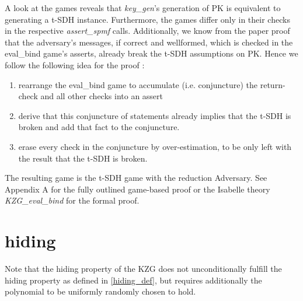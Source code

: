 A look at the games reveals that \textit{key\_gen}'s generation of PK is equivalent to generating a t-SDH instance. Furthermore, the games differ only in their checks in the respective \textit{assert\_spmf} calls.  
Additionally, we know from the paper proof that the adversary's messages, if correct and wellformed, which is checked in the eval\_bind game's asserts, already break the t-SDH assumptions on PK. 
Hence we follow the following idea for the proof :
\begin{enumerate}
    \item rearrange the eval\_bind game to accumulate (i.e. conjuncture) the return-check and all other checks into an assert
    \item derive that this conjuncture of statements already implies that the t-SDH is broken and add that fact to the conjuncture.
    \item erase every check in the conjuncture by over-estimation, to be only left with the result that the t-SDH is broken.
\end{enumerate}
The resulting game is the t-SDH game with the reduction Adversary. 
See Appendix A for the fully outlined game-based proof or the Isabelle theory \textit{KZG\_eval\_bind} for the formal proof.

\section{hiding}
Note that the hiding property of the KZG does not unconditionally fulfill the hiding property as defined in \ref{hiding_def}, but requires additionally the polynomial to be uniformly randomly chosen to hold.

